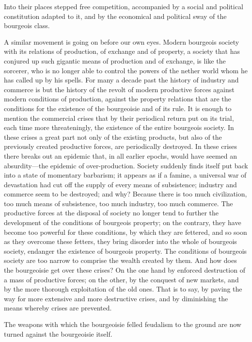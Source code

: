 Into their places stepped free competition, accompanied by a social and political constitution adapted to it, and by the economical and political sway of the bourgeois class.

A similar movement is going on before our own eyes. Modern bourgeois society with its relations of production, of exchange and of property, a society that has conjured up such gigantic means of production and of exchange, is like the sorcerer, who is no longer able to control the powers of the nether world whom he has called up by his spells. For many a decade past the history of industry and commerce is but the history of the revolt of modern productive forces against modern conditions of production, against the property relations that are the conditions for the existence of the bourgeoisie and of its rule. It is enough to mention the commercial crises that by their periodical return put on its trial, each time more threateningly, the existence of the entire bourgeois society. In these crises a great part not only of the existing products, but also of the previously created productive forces, are periodically destroyed. In these crises there breaks out an epidemic that, in all earlier epochs, would have seemed an absurdity—the epidemic of over-production. Society suddenly finds itself put back into a state of momentary barbarism; it appears as if a famine, a universal war of devastation had cut off the supply of every means of subsistence; industry and commerce seem to be destroyed; and why? Because there is too much civilization, too much means of subsistence, too much industry, too much commerce. The productive forces at the disposal of society no longer tend to further the development of the conditions of bourgeois property; on the contrary, they have become too powerful for these conditions, by which they are fettered, and so soon as they overcome these fetters, they bring disorder into the whole of bourgeois society, endanger the existence of bourgeois property. The conditions of bourgeois society are too narrow to comprise the wealth created by them. And how does the bourgeoisie get over these crises? On the one hand by enforced destruction of a mass of productive forces; on the other, by the conquest of new markets, and by the more thorough exploitation of the old ones. That is to say, by paving the way for more extensive and more destructive crises, and by diminishing the means whereby crises are prevented.

The weapons with which the bourgeoisie felled feudalism to the ground are now turned against the bourgeoisie itself.

